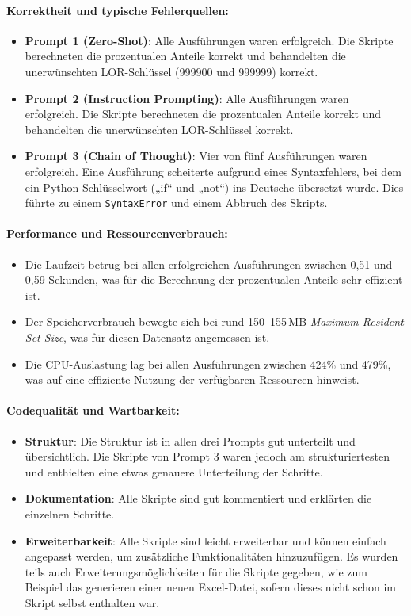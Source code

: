 \documentclass[11pt,a4paper]{article}
\begin{document}
\paragraph{Korrektheit und typische Fehlerquellen:}
\begin{itemize}
    \item \textbf{Prompt 1 (Zero-Shot)}: Alle Ausführungen waren erfolgreich. Die Skripte berechneten die prozentualen Anteile korrekt und behandelten die unerwünschten LOR-Schlüssel (999900 und 999999) korrekt.
    \item \textbf{Prompt 2 (Instruction Prompting)}: Alle Ausführungen waren erfolgreich. Die Skripte berechneten die prozentualen Anteile korrekt und behandelten die unerwünschten LOR-Schlüssel korrekt.
    \item \textbf{Prompt 3 (Chain of Thought)}: Vier von fünf Ausführungen waren erfolgreich. Eine Ausführung scheiterte aufgrund eines Syntaxfehlers, bei dem ein Python-Schlüsselwort („if“ und „not“) ins Deutsche übersetzt wurde. Dies führte zu einem \verb|SyntaxError| und einem Abbruch des Skripts.
\end{itemize}

\paragraph{Performance und Ressourcenverbrauch:}
\begin{itemize}
    \item Die Laufzeit betrug bei allen erfolgreichen Ausführungen zwischen 0,51 und 0,59 Sekunden, was für die Berechnung der prozentualen Anteile sehr effizient ist.
    \item Der Speicherverbrauch bewegte sich bei rund 150--155\,MB \emph{Maximum Resident Set Size}, was für diesen Datensatz angemessen ist.
    \item Die CPU-Auslastung lag bei allen Ausführungen zwischen 424\% und 479\%, was auf eine effiziente Nutzung der verfügbaren Ressourcen hinweist.
\end{itemize}

\paragraph{Codequalität und Wartbarkeit:}
\begin{itemize}
    \item \textbf{Struktur}: Die Struktur ist in allen drei Prompts gut unterteilt und übersichtlich. Die Skripte von Prompt 3 waren jedoch am strukturiertesten und enthielten eine etwas genauere Unterteilung der Schritte.
    \item \textbf{Dokumentation}: Alle Skripte sind gut kommentiert und erklärten die einzelnen Schritte.
    \item \textbf{Erweiterbarkeit}: Alle Skripte sind leicht erweiterbar und können einfach angepasst werden, um zusätzliche Funktionalitäten hinzuzufügen. Es wurden teils auch Erweiterungsmöglichkeiten für die Skripte gegeben, wie zum Beispiel das generieren einer neuen Excel-Datei, sofern dieses nicht schon im Skript selbst enthalten war. 
\end{itemize}
\end{document}

